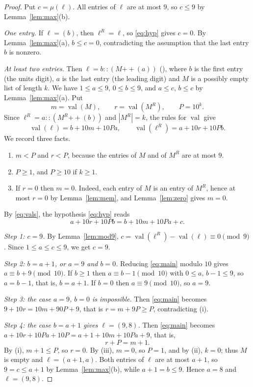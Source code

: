 \documentclass[11pt]{amsart}
\theoremstyle{plain}
\theoremstyle{definition}
\newcommand{\val}{\operatorname{val}}
\begin{document}
\begin{proof}
Put $c=\mu(\ell)$. All entries of $\ell$ are at most $9$, so $c\le9$ by Lemma~\ref{lem:max}(b).

\emph{One entry.} If $\ell=(b)$, then $\ell^R=\ell$, so \eqref{eq:hyp} gives $c=0$. By Lemma~\ref{lem:max}(a), $b\le c=0$, contradicting the assumption that the last entry $b$ is nonzero.

\emph{At least two entries.} Then $\ell=b::(M\mathbin{+\!\!+}(a))$ (), where $b$ is the first entry (the units digit), $a$ is the last entry (the leading digit) and $M$ is a possibly empty list of length $k$. We have $1\le a\le9$, $0\le b\le9$, and $a\le c$, $b\le c$ by Lemma~\ref{lem:max}(a). Put
\[
  m=\val(M),\qquad r=\val(M^R),\qquad P=10^k.
\]
Since $\ell^R=a::(M^R\mathbin{+\!\!+}(b))$ and $|M^R|=k$, the rules for $\val$ give
\begin{equation}\label{eq:vals}
  \val(\ell)=b+10m+10Pa,\qquad \val(\ell^R)=a+10r+10Pb.
\end{equation}
We record three facts.
\begin{enumerate}
\item[(i)] $m<P$ and $r<P$, because the entries of $M$ and of $M^R$ are at most $9$.
\item[(ii)] $P\ge1$, and $P\ge10$ if $k\ge1$.
\item[(iii)] If $r=0$ then $m=0$. Indeed, each entry of $M$ is an entry of $M^R$, hence at most $r=0$ by Lemma~\ref{lem:mem}, and Lemma~\ref{lem:zero} gives $m=0$.
\end{enumerate}
By \eqref{eq:vals}, the hypothesis \eqref{eq:hyp} reads
\begin{equation}\label{eq:main}
  a+10r+10Pb=b+10m+10Pa+c.
\end{equation}

\emph{Step 1: $c=9$.} By Lemma~\ref{lem:mod9}, $c=\val(\ell^R)-\val(\ell)\equiv0\pmod 9$. Since $1\le a\le c\le 9$, we get $c=9$.

\emph{Step 2: $b=a+1$, or $a=9$ and $b=0$.} Reducing \eqref{eq:main} modulo $10$ gives $a\equiv b+9\pmod{10}$. If $b\ge1$ then $a\equiv b-1\pmod{10}$ with $0\le a,\,b-1\le9$, so $a=b-1$, that is, $b=a+1$. If $b=0$ then $a\equiv9\pmod{10}$, so $a=9$.

\emph{Step 3: the case $a=9$, $b=0$ is impossible.} Then \eqref{eq:main} becomes $9+10r=10m+90P+9$, that is $r=m+9P\ge P$, contradicting (i).

\emph{Step 4: the case $b=a+1$ gives $\ell=(9,8)$.} Then \eqref{eq:main} becomes $a+10r+10Pa+10P=a+1+10m+10Pa+9$, that is,
\[
  r+P=m+1.
\]
By (i), $m+1\le P$, so $r=0$. By (iii), $m=0$, so $P=1$, and by (ii), $k=0$; thus $M$ is empty and $\ell=(a+1,a)$. Both entries of $\ell$ are at most $a+1$, so $9=c\le a+1$ by Lemma~\ref{lem:max}(b), while $a+1=b\le9$. Hence $a=8$ and $\ell=(9,8)$.
\end{proof}
\end{document}
